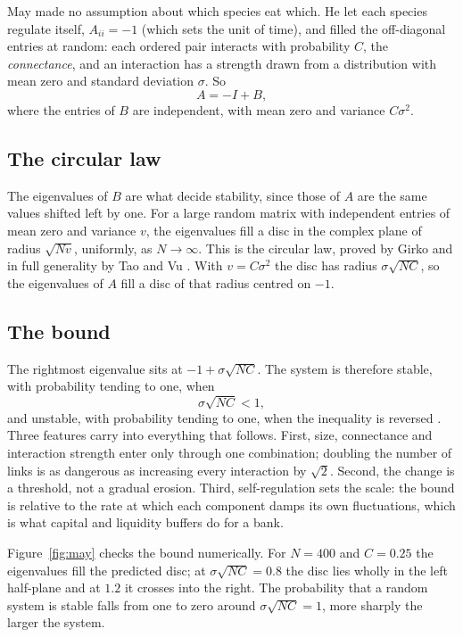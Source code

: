 \documentclass[11pt,a4paper]{article}
\theoremstyle{definition}
\theoremstyle{remark}
\begin{document}
May made no assumption about which species eat which. He let each species regulate itself, $A_{ii} = -1$ (which sets the unit of time), and filled the off-diagonal entries at random: each ordered pair interacts with probability $C$, the \emph{connectance}, and an interaction has a strength drawn from a distribution with mean zero and standard deviation $\sigma$. So
\begin{equation}
A = -I + B ,
\end{equation}
where the entries of $B$ are independent, with mean zero and variance $C\sigma^2$.

\subsection{The circular law}

The eigenvalues of $B$ are what decide stability, since those of $A$ are the same values shifted left by one. For a large random matrix with independent entries of mean zero and variance $v$, the eigenvalues fill a disc in the complex plane of radius $\sqrt{Nv}$, uniformly, as $N \to \infty$. This is the circular law, proved by Girko and in full generality by Tao and Vu \citep{TaoVu2010}. With $v = C\sigma^2$ the disc has radius $\sigma\sqrt{NC}$, so the eigenvalues of $A$ fill a disc of that radius centred on $-1$.

\subsection{The bound}

The rightmost eigenvalue sits at $-1 + \sigma\sqrt{NC}$. The system is therefore stable, with probability tending to one, when
\begin{equation}
\sigma\sqrt{NC} < 1 ,
\label{eq:may}
\end{equation}
and unstable, with probability tending to one, when the inequality is reversed \citep{May1972}. Three features carry into everything that follows. First, size, connectance and interaction strength enter only through one combination; doubling the number of links is as dangerous as increasing every interaction by $\sqrt 2$. Second, the change is a threshold, not a gradual erosion. Third, self-regulation sets the scale: the bound is relative to the rate at which each component damps its own fluctuations, which is what capital and liquidity buffers do for a bank.

Figure~\ref{fig:may} checks the bound numerically. For $N = 400$ and $C = 0.25$ the eigenvalues fill the predicted disc; at $\sigma\sqrt{NC} = 0.8$ the disc lies wholly in the left half-plane and at $1.2$ it crosses into the right. The probability that a random system is stable falls from one to zero around $\sigma\sqrt{NC} = 1$, more sharply the larger the system.
\end{document}
